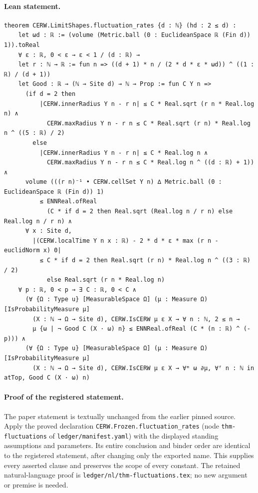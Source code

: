 \paragraph{Lean statement.}
\begin{verbatim}
theorem CERW.LimitShapes.fluctuation_rates {d : ℕ} (hd : 2 ≤ d) :
    let ωd : ℝ := (volume (Metric.ball (0 : EuclideanSpace ℝ (Fin d)) 1)).toReal
    ∀ ε : ℝ, 0 < ε → ε < 1 / (d : ℝ) →
    let r : ℕ → ℝ := fun n => ((d + 1) * n / (2 * d * ε * ωd)) ^ ((1 : ℝ) / (d + 1))
    let Good : ℝ → (ℕ → Site d) → ℕ → Prop := fun C Y n =>
      (if d = 2 then
          |CERW.innerRadius Y n - r n| ≤ C * Real.sqrt (r n * Real.log n) ∧
            CERW.maxRadius Y n - r n ≤ C * Real.sqrt (r n) * Real.log n ^ ((5 : ℝ) / 2)
        else
          |CERW.innerRadius Y n - r n| ≤ C * Real.log n ∧
            CERW.maxRadius Y n - r n ≤ C * Real.log n ^ ((d : ℝ) + 1)) ∧
      volume (((r n)⁻¹ • CERW.cellSet Y n) ∆ Metric.ball (0 : EuclideanSpace ℝ (Fin d)) 1)
          ≤ ENNReal.ofReal
            (C * if d = 2 then Real.sqrt (Real.log n / r n) else Real.log n / r n) ∧
      ∀ x : Site d,
        |(CERW.localTime Y n x : ℝ) - 2 * d * ε * max (r n - euclidNorm x) 0|
          ≤ C * if d = 2 then Real.sqrt (r n) * Real.log n ^ ((3 : ℝ) / 2)
            else Real.sqrt (r n * Real.log n)
    ∀ p : ℝ, 0 < p → ∃ C : ℝ, 0 < C ∧
      (∀ {Ω : Type u} [MeasurableSpace Ω] (μ : Measure Ω) [IsProbabilityMeasure μ]
        (X : ℕ → Ω → Site d), CERW.IsCERW μ ε X → ∀ n : ℕ, 2 ≤ n →
        μ {ω | ¬ Good C (X · ω) n} ≤ ENNReal.ofReal (C * (n : ℝ) ^ (-p))) ∧
      (∀ {Ω : Type u} [MeasurableSpace Ω] (μ : Measure Ω) [IsProbabilityMeasure μ]
        (X : ℕ → Ω → Site d), CERW.IsCERW μ ε X → ∀ᵐ ω ∂μ, ∀ᶠ n : ℕ in atTop, Good C (X · ω) n)
\end{verbatim}
\paragraph{Proof of the registered statement.}
The paper statement is textually unchanged from the earlier pinned source.
Apply the proved declaration \texttt{CERW.Frozen.fluctuation\_rates}
(node \texttt{thm-fluctuations} of \texttt{ledger/manifest.yaml}) with the displayed
standing assumptions and parameters. Its entire conclusion and binder order
are identical to the registered statement, after changing only the exported
name. This supplies every asserted clause and preserves the scope of every
constant. The retained natural-language proof is
\texttt{ledger/nl/thm-fluctuations.tex}; no new argument or premise is needed.
